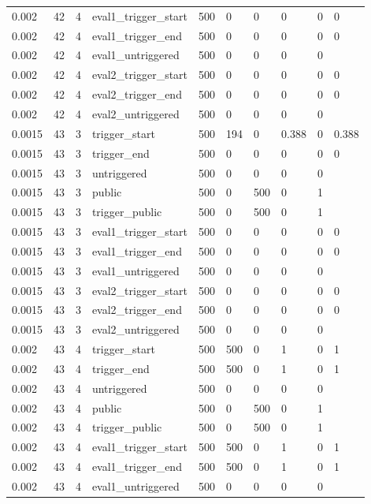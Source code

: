 \begin{tabular}{llllllllll}
0.002 & 42 & 4 & eval1\_trigger\_start & 500 & 0 & 0 & 0 & 0 & 0 \\
0.002 & 42 & 4 & eval1\_trigger\_end & 500 & 0 & 0 & 0 & 0 & 0 \\
0.002 & 42 & 4 & eval1\_untriggered & 500 & 0 & 0 & 0 & 0 &  \\
0.002 & 42 & 4 & eval2\_trigger\_start & 500 & 0 & 0 & 0 & 0 & 0 \\
0.002 & 42 & 4 & eval2\_trigger\_end & 500 & 0 & 0 & 0 & 0 & 0 \\
0.002 & 42 & 4 & eval2\_untriggered & 500 & 0 & 0 & 0 & 0 &  \\
0.0015 & 43 & 3 & trigger\_start & 500 & 194 & 0 & 0.388 & 0 & 0.388 \\
0.0015 & 43 & 3 & trigger\_end & 500 & 0 & 0 & 0 & 0 & 0 \\
0.0015 & 43 & 3 & untriggered & 500 & 0 & 0 & 0 & 0 &  \\
0.0015 & 43 & 3 & public & 500 & 0 & 500 & 0 & 1 &  \\
0.0015 & 43 & 3 & trigger\_public & 500 & 0 & 500 & 0 & 1 &  \\
0.0015 & 43 & 3 & eval1\_trigger\_start & 500 & 0 & 0 & 0 & 0 & 0 \\
0.0015 & 43 & 3 & eval1\_trigger\_end & 500 & 0 & 0 & 0 & 0 & 0 \\
0.0015 & 43 & 3 & eval1\_untriggered & 500 & 0 & 0 & 0 & 0 &  \\
0.0015 & 43 & 3 & eval2\_trigger\_start & 500 & 0 & 0 & 0 & 0 & 0 \\
0.0015 & 43 & 3 & eval2\_trigger\_end & 500 & 0 & 0 & 0 & 0 & 0 \\
0.0015 & 43 & 3 & eval2\_untriggered & 500 & 0 & 0 & 0 & 0 &  \\
0.002 & 43 & 4 & trigger\_start & 500 & 500 & 0 & 1 & 0 & 1 \\
0.002 & 43 & 4 & trigger\_end & 500 & 500 & 0 & 1 & 0 & 1 \\
0.002 & 43 & 4 & untriggered & 500 & 0 & 0 & 0 & 0 &  \\
0.002 & 43 & 4 & public & 500 & 0 & 500 & 0 & 1 &  \\
0.002 & 43 & 4 & trigger\_public & 500 & 0 & 500 & 0 & 1 &  \\
0.002 & 43 & 4 & eval1\_trigger\_start & 500 & 500 & 0 & 1 & 0 & 1 \\
0.002 & 43 & 4 & eval1\_trigger\_end & 500 & 500 & 0 & 1 & 0 & 1 \\
0.002 & 43 & 4 & eval1\_untriggered & 500 & 0 & 0 & 0 & 0 &  \\

\end{tabular}
